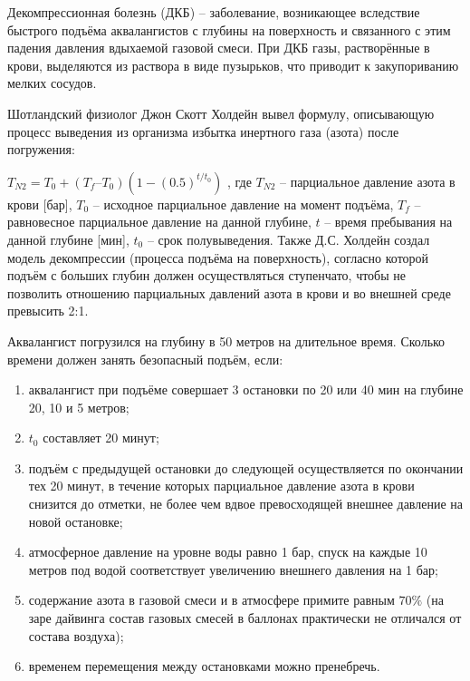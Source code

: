
Декомпрессионная
болезнь (ДКБ) – заболевание, возникающее вследствие быстрого подъёма
аквалангистов с глубины на поверхность и связанного с этим падения давления
вдыхаемой газовой смеси. При ДКБ газы, растворённые в крови, выделяются из
раствора в виде пузырьков, что приводит к закупориванию мелких сосудов.

Шотландский
физиолог Джон Скотт Холдейн вывел формулу, описывающую процесс выведения из
организма избытка инертного газа (азота) после погружения:

$T_{N2}= T_0 + (T_f – T_0)(1-(0.5)^{t/t_0})$ ,
где $T_{N2}$  – парциальное давление азота в крови [бар], $T_0$ –
исходное парциальное давление на момент подъёма, $T_f$  – равновесное
парциальное давление на данной глубине, $t$  – время пребывания на данной глубине
[мин], $t_0$  – срок полувыведения. Также Д.С. Холдейн создал модель
декомпрессии (процесса подъёма на поверхность), согласно которой подъём с
больших глубин должен осуществляться ступенчато, чтобы не позволить отношению
парциальных давлений азота в крови и во внешней среде превысить 2:1.

Аквалангист
погрузился на глубину в 50 метров на длительное время. Сколько времени должен
занять безопасный подъём, если:

\begin{enumerate}
    \item аквалангист при подъёме совершает 3 остановки по 20 или 40 мин на глубине 20, 10 и 5 метров; 
    \item $t_0$ составляет 20 минут;
    \item подъём с предыдущей остановки до следующей осуществляется по окончании тех 20 минут, в течение которых парциальное давление азота в крови снизится до
отметки, не более чем вдвое превосходящей внешнее давление на новой остановке;
    \item атмосферное давление на уровне воды равно 1 бар, спуск на каждые 10 метров под водой
соответствует увеличению внешнего давления на 1 бар;
    \item содержание азота в газовой смеси и в атмосфере примите равным $70\%$ (на заре
дайвинга состав газовых смесей в баллонах практически не отличался от состава
воздуха);
    \item временем перемещения между остановками можно пренебречь.
\end{enumerate}

\explanationSection

